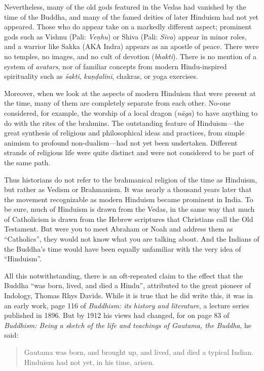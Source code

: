 \documentclass[12pt,openany]{book}%
\begin{document}
Nevertheless, many of the old gods featured in the Vedas had vanished by the time of the Buddha, and many of the famed deities of later Hinduism had not yet appeared. Those who do appear take on a markedly different aspect; prominent gods such as Vishnu (Pali: \textit{\textsanskrit{Veṇhu}}) or Shiva (Pali: \textit{Siva}) appear in minor roles, and a warrior like Sakka (AKA Indra) appears as an apostle of peace. There were no temples, no images, and no cult of devotion (\textit{bhakti}). There is no mention of a system of \textit{avatars}, nor of familiar concepts from modern Hindu-inspired spirituality such as \textit{\textsanskrit{śakti}}, \textit{\textsanskrit{kuṇḍalinī}}, chakras, or yoga exercises.

Moreover, when we look at the aspects of modern Hinduism that were present at the time, many of them are completely separate from each other. No-one considered, for example, the worship of a local dragon (\textit{\textsanskrit{nāga}}) to have anything to do with the rites of the brahmins. The outstanding feature of Hinduism—the great synthesis of religious and philosophical ideas and practices, from simple animism to profound non-dualism—had not yet been undertaken. Different strands of religious life were quite distinct and were not considered to be part of the same path.

Thus historians do not refer to the brahmanical religion of the time as Hinduism, but rather as Vedism or Brahmanism. It was nearly a thousand years later that the movement recognizable as modern Hinduism became prominent in India. To be sure, much of Hinduism is drawn from the Vedas, in the same way that much of Catholicism is drawn from the Hebrew scriptures that Christians call the Old Testament. But were you to meet Abraham or Noah and address them as “Catholics”, they would not know what you are talking about. And the Indians of the Buddha’s time would have been equally unfamiliar with the very idea of “Hinduism”.

All this notwithstanding, there is an oft-repeated claim to the effect that the Buddha “was born, lived, and died a Hindu”, attributed to the great pioneer of Indology, Thomas Rhys Davids. While it is true that he did write this, it was in an early work, page 116 of \textit{Buddhism: its history and literature}, a lecture series published in 1896. But by 1912 his views had changed, for on page 83 of \textit{Buddhism: Being a sketch of the life and teachings of Gautama, the Buddha}, he said:

\begin{quotation}%
Gautama was born, and brought up, and lived, and died a typical Indian. Hinduism had not yet, in his time, arisen.

%
\end{quotation}
\end{document}
